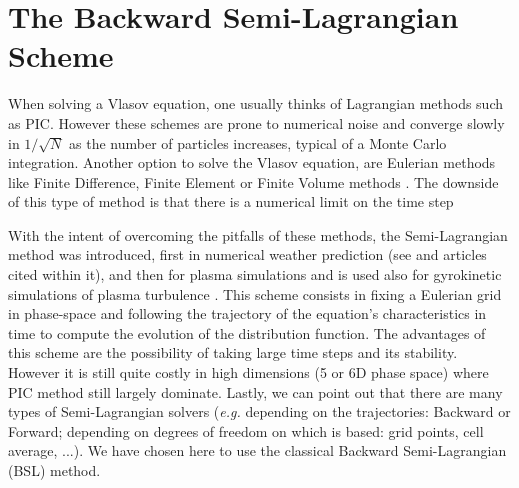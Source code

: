 \documentclass[proc]{edpsmath}
\begin{document}


\section{The Backward Semi-Lagrangian Scheme}
\label{sec:BSL_scheme}

When solving a Vlasov equation, one usually thinks of Lagrangian methods such as PIC\cite{Birdsall:1985:PPV:577251}. However  these schemes are prone to numerical noise and converge slowly in $1/\sqrt{N}$ as the number of particles increases, typical of a Monte Carlo integration. Another option to solve the Vlasov equation, are Eulerian methods like Finite Difference, Finite Element or Finite Volume methods
 \cite{filbet2003, Zaki1988184, banks2010}. The downside of this type of method is that there is a numerical limit on the time step

With the intent of overcoming  the pitfalls of these methods, the Semi-Lagrangian method was introduced, first in numerical weather prediction (see \cite{Kalnay03atmosphericmodeling} and articles cited within it), and then   for plasma simulations \cite{Sonnendrucker1999201, Cheng1976330} and is used also for gyrokinetic simulations of plasma turbulence \cite{grandgirard2006,kwon2015}.
This scheme consists in fixing a Eulerian grid in phase-space and following the trajectory of the equation's characteristics in time to compute the evolution of the distribution function. The advantages of this scheme are the possibility of taking large time steps and its stability. However it is still quite costly in  high dimensions (5 or 6D phase space) where PIC method still largely dominate.
 Lastly, we can point out that there are many types of Semi-Lagrangian solvers (\emph{e.g.} depending on the trajectories: Backward or Forward;  depending on degrees of freedom on which is based: grid points,  cell average, ...). We have chosen here to use the classical Backward Semi-Lagrangian (BSL) method. 
\end{document}
